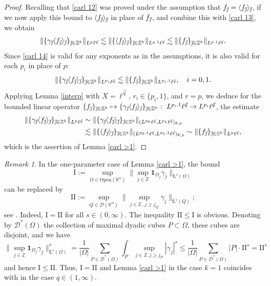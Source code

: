 \documentclass[11pt, reqno]{amsart}
\theoremstyle{definition}
\theoremstyle{remark}
\newtheorem{remark}[theorem]{Remark}
\numberwithin{equation}{section}
\newcommand{\R}{\mathbb R}
\newcommand{\vj}{\vec{\textit{\j}}}
\newcommand{\vq}{\vec q}
\newcommand{\one}{\mathbf{1}}
\newcommand{\aveL}{\textit{\L}}
\newcommand{\Avee}[2]{\langle#1\rangle_{#2}}
\newcommand{\Norm}[2]{\|#1\|_{#2}}
\newcommand{\Open}{\mathrm{Open}}
\begin{document}
\begin{proof}
Recalling that \eqref{carl 12} was proved under the assumption that $f_{\vj}=\Avee{f_{\vj}}{\vj}$, if we now apply this bound to $\Avee{f_{\vj}}{\vj}$ in place of $f_{\vj}$, and combine this with \eqref{carl 13}, we obtain
\begin{equation}\label{carl 14}
\Norm{\{\gamma_{\vj}\Avee{f_{\vj}}{\vj}\}_{\vj\in\mathbb Z^k}}{L^p\ell^{\vq}}
\lesssim \Norm{\{\Avee{f_{\vj}}{\vj}\}_{\vj\in\mathbb Z^k}}{L^{p,1}\ell^{\vq}}
\lesssim \Norm{\{f_{\vj}\}_{\vj\in\mathbb Z^k}}{L^{p,1}\ell^{\vq}}.
\end{equation}
Since \eqref{carl 14} is valid for any exponents as in the assumptions, it is also valid for each $p_i$ in place of $p$:
\begin{equation*}
\Norm{\{\gamma_{\vj}\Avee{f_{\vj}}{\vj}\}_{\vj\in\mathbb Z^k}}{L^{p_i}\ell^{\vq}}
\lesssim \Norm{\{f_{\vj}\}_{\vj\in\mathbb Z^k}}{L^{p_i,1}\ell^{\vq}},\quad i=0,1.
\end{equation*}
Applying Lemma \ref{interp} with $X=\ell^{\vq}$, $r_i\in\{p_i,1\}$, and $r=p$, we deduce for the bounded linear operator $\{f_{\vj}\}_{\vj\in\mathbb Z^k}\mapsto\{\gamma_{\vj}\Avee{f_{\vj}}{\vj}\}_{\vj\in\mathbb Z^k}:\ L^{p_i,1}\ell^{\vq}\to L^{p_i}\ell^{\vq}$, the estimate
\begin{equation*}
\begin{split}
\Norm{\{\gamma_{\vj}\Avee{f_{\vj}}{\vj}\}_{\vj\in\mathbb Z^k}}{L^{p}\ell^{\vq}}
&\sim\Norm{\{\gamma_{\vj}\Avee{f_{\vj}}{\vj}\}_{\vj\in\mathbb Z^k}}{(L^{p_0}\ell^{\vq},L^{p_1}\ell^{\vq})_{\theta,p}} \\
&\lesssim\Norm{\{\Avee{f_{\vj}}{\vj}\}_{\vj\in\mathbb Z^k}}{(L^{p_0,1}\ell^{\vq},L^{p_1,1}\ell^{\vq})_{\theta,p}}
\sim \Norm{\{f_{\vj}\}_{\vj\in\mathbb Z^k}}{L^p\ell^{\vq}},
\end{split}
\end{equation*}
which is the assertion of Lemma \ref{carl >1}.
\end{proof}

\begin{remark} \label{10.31}
In the one-parameter case of Lemma \ref{carl >1},
the bound
$$
\mathrm{I}:=\sup_{\Omega\in\Open(\R^{n})}\bigg\|\sup_{j\in\mathbb Z}
\one_{\Omega_{j}} \gamma_j \bigg\|_{\aveL^s(\Omega)}
$$
can be replaced by
$$
\mathrm{II}:=\sup_{Q\in\mathscr D(\mathbb R^n)}
\bigg\|\sup_{j\in\mathbb Z,\,j\geq j_Q} \gamma_j\bigg\|_{\aveL^s(Q)};
$$
see \cite[Theorem 3.7(ii)]{FR21}.
Indeed, $\mathrm{I}=\mathrm{II}$ for all $s\in(0,\infty)$.
The inequality $\mathrm{II}\leq\mathrm{I}$ is obvious.
Denoting by $\mathscr D^*(\Omega)$ the collection of maximal dyadic cubes
$P\subset\Omega$, these cubes are disjoint, and we have
$$
\bigg\|\sup_{j\in\mathbb Z}
\one_{\Omega_{j}} \gamma_j \bigg\|_{\aveL^s(\Omega)}^s
= \frac{1}{|\Omega|} \sum_{P\in \mathscr D^*(\Omega)}
\int_P \sup_{j\in\mathbb Z,j\geq j_P} |\gamma_j|^s
\leq \frac{1}{|\Omega|} \sum_{P\in \mathscr D^*(\Omega)} |P| \cdot\mathrm{II}^s
=\mathrm{II}^s
$$
and hence $\mathrm{I}\leq\mathrm{II}$.
Thus, $\mathrm{I}=\mathrm{II}$ and Lemma \ref{carl >1} in the case $k=1$
coincides with \cite[Theorem 3.7(ii)]{FR21} in the case $q\in(1,\infty)$.
\end{remark}
\end{document}
